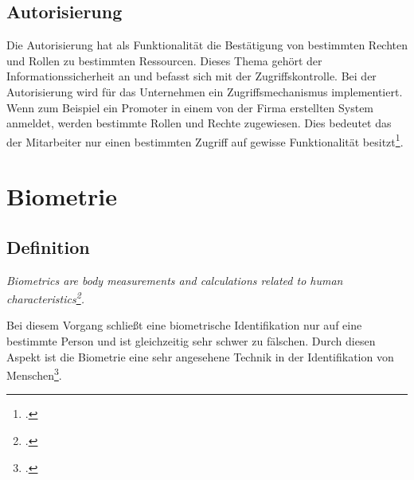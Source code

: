 \subsection{Autorisierung}
Die Autorisierung hat als Funktionalität die Bestätigung von bestimmten Rechten und Rollen zu bestimmten Ressourcen. Dieses Thema gehört der Informationssicherheit an und befasst sich mit der Zugriffskontrolle. Bei der Autorisierung wird für das Unternehmen ein Zugriffsmechanismus implementiert. Wenn zum Beispiel ein Promoter in einem von der Firma erstellten System anmeldet, werden bestimmte Rollen und Rechte zugewiesen. Dies bedeutet das der Mitarbeiter nur einen bestimmten Zugriff auf gewisse Funktionalität besitzt\footcite{anmeldevorgangs}.



\section{Biometrie}
\subsection{Definition}
\begin{center}
	\textit{Biometrics are body measurements and calculations related to human characteristics\footcite{biometrie}.}
\end{center}

Bei diesem Vorgang schließt eine biometrische Identifikation nur auf eine bestimmte Person und ist gleichzeitig sehr schwer zu fälschen.
Durch diesen Aspekt ist die Biometrie eine sehr angesehene Technik in der Identifikation von Menschen\footcite{biometrie}.

